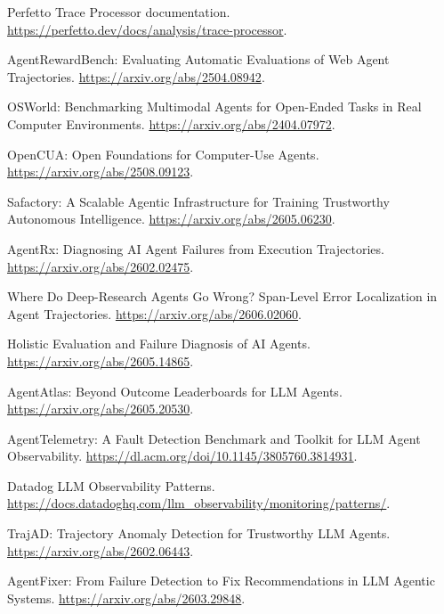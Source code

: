 \documentclass[10pt,twocolumn]{ctexart}
\begin{document}
\noindent [18] Perfetto Trace Processor documentation. \url{https://perfetto.dev/docs/analysis/trace-processor}.\par
\noindent [19] AgentRewardBench: Evaluating Automatic Evaluations of Web Agent Trajectories. \url{https://arxiv.org/abs/2504.08942}.\par
\noindent [20] OSWorld: Benchmarking Multimodal Agents for Open-Ended Tasks in Real Computer Environments. \url{https://arxiv.org/abs/2404.07972}.\par
\noindent [21] OpenCUA: Open Foundations for Computer-Use Agents. \url{https://arxiv.org/abs/2508.09123}.\par
\noindent [22] Safactory: A Scalable Agentic Infrastructure for Training Trustworthy Autonomous Intelligence. \url{https://arxiv.org/abs/2605.06230}.\par
\noindent [23] AgentRx: Diagnosing AI Agent Failures from Execution Trajectories. \url{https://arxiv.org/abs/2602.02475}.\par
\noindent [24] Where Do Deep-Research Agents Go Wrong? Span-Level Error Localization in Agent Trajectories. \url{https://arxiv.org/abs/2606.02060}.\par
\noindent [25] Holistic Evaluation and Failure Diagnosis of AI Agents. \url{https://arxiv.org/abs/2605.14865}.\par
\noindent [26] AgentAtlas: Beyond Outcome Leaderboards for LLM Agents. \url{https://arxiv.org/abs/2605.20530}.\par
\noindent [27] AgentTelemetry: A Fault Detection Benchmark and Toolkit for LLM Agent Observability. \url{https://dl.acm.org/doi/10.1145/3805760.3814931}.\par
\noindent [28] Datadog LLM Observability Patterns. \url{https://docs.datadoghq.com/llm_observability/monitoring/patterns/}.\par
\noindent [29] TrajAD: Trajectory Anomaly Detection for Trustworthy LLM Agents. \url{https://arxiv.org/abs/2602.06443}.\par
\noindent [30] AgentFixer: From Failure Detection to Fix Recommendations in LLM Agentic Systems. \url{https://arxiv.org/abs/2603.29848}.
\end{document}
